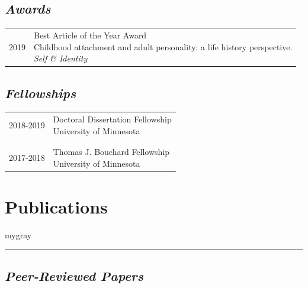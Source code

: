 \documentclass[
]{article}
\begin{document}
\hypertarget{awards}{%
\subsection{\texorpdfstring{\emph{Awards}}{Awards}}\label{awards}}

\begin{longtable}{p{2.25cm}p{5.5in}}
2019 & \parbox[t]{5.0in}{Best Article of the Year Award \newline Childhood attachment and adult personality: a life history perspective. \newline \textit{Self \& Identity}} \\
\end{longtable}

\hypertarget{fellowships}{%
\subsection{\texorpdfstring{\emph{Fellowships}}{Fellowships}}\label{fellowships}}

\begin{longtable}{p{2.25cm}p{5.5in}}
2018-2019 & \parbox[t]{5.0in}{Doctoral Dissertation Fellowship \newline University of Minnesota} \\\\& \\
2017-2018 & \parbox[t]{5.0in}{Thomas J. Bouchard Fellowship \newline University of Minnesota} \\
\end{longtable}

\vspace{1ex}

\hypertarget{publications}{%
\section{\texorpdfstring{\textbf{Publications}}{Publications}}\label{publications}}

\vspace{1ex}
\begin{color}{mygray}\hrule\end{color}
\vspace{1ex}

\hypertarget{peer-reviewed-papers}{%
\subsection{\texorpdfstring{\emph{Peer-Reviewed
Papers}}{Peer-Reviewed Papers}}\label{peer-reviewed-papers}}
\end{document}
